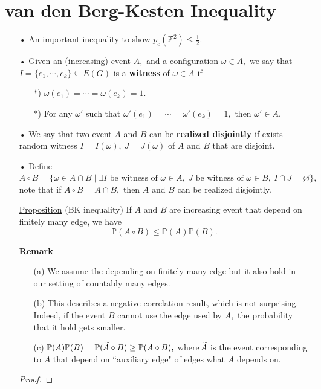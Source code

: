 \documentclass[12pt,a4paper]{report}
\theoremstyle{definition}
\newcommand{\oversim}[1]{\parbox[t][-18pt][c]{10pt}{\scriptsize$\sim$}\hspace*{-12pt}{#1}}
\begin{document}
\section{van den Berg-Kesten Inequality}
\begin{enumerate}
    \item[•] An important inequality to show $p_c(\mathbb{Z}^2)\leq \frac{1}{2}.$
    \item[•] Given an (increasing) event $A,$ and a configuration $\omega\in A,$ we say that \\ $I=\{e_1,\cdots , e_k\}\subseteq E(G)$ is a \textbf{witness} of $\omega\in A$ if
    \begin{enumerate}
        \item[$*$)] $\omega(e_1)=\cdots =\omega(e_k)=1.$
        \item[$*$)] For any $\omega'$ such that $\omega'(e_1)=\cdots =\omega'(e_k)=1,$ then $\omega'\in A.$
    \end{enumerate}
    \item[•] We say that two event $A$ and $B$ can be \textbf{realized disjointly} if exists random witness $I=I(\omega),\ J=J(\omega)$ of $A$ and $B$ that are disjoint.
    \item[•] Define $A\circ B=\{\omega\in A\cap B\mid \exists I\mbox{ be witness of }\omega\in A,\ J\mbox{ be witness of }\omega\in B,\ I\cap J=\varnothing\},$ note that if $A\circ B=A\cap B,$ then $A$ and $B$ can be realized disjointly.
    \item[\underline{Proposition}] (BK inequality) If $A$ and $B$ are increasing event that depend on finitely many edge, we have
    \[
    \mathbb{P}(A\circ B)\leq \mathbb{P}(A)\mathbb{P}(B).
    \]
    \item[\textbf{Remark}] \begin{enumerate}
        \item[(a)] We assume the depending on finitely many edge but it also hold in our setting of countably many edges.
        \item[(b)] This describes a negative correlation result, which is not surprising. Indeed, if the event $B$ cannot use the edge used by $A,$ the probability that it hold gets smaller.
        \item[(c)] $\mathbb{P}(A)\mathbb{P}(B)=\mathbb{P}(\,\oversim{A}\circ B)\geq \mathbb{P}(A\circ B),$ where $\oversim{A}$ is the event corresponding to $A$ that depend on ``auxiliary edge" of edges what $A$ depends on.
    \end{enumerate}
    \begin{proof}

\end{proof}
\end{enumerate}
\end{document}
